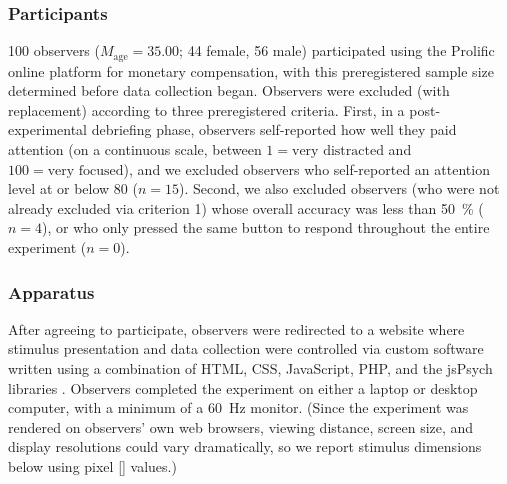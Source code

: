 \subsubsection{Participants}
100 observers ($M_\text{age} = 35.00$; 44 female, 56 male) participated using the Prolific online platform \parencite{palan_prolificacsubject_2018} for monetary compensation, with this preregistered sample size determined before data collection began.  Observers were excluded (with replacement) according to three preregistered criteria.  First, in a post-experimental debriefing phase, observers self-reported how well they paid attention (on a continuous scale, between $1 = \text{very distracted}$ and $100 = \text{very focused}$), and we excluded observers who self-reported an attention level at or below 80 ($n = 15$).  Second, we also excluded observers (who were not already excluded via criterion 1) whose overall accuracy was less than \qty{50}{\percent} ($n = 4$), or who only pressed the same button to respond throughout the entire experiment ($n = 0$).
\subsubsection{Apparatus}
After agreeing to participate, observers were redirected to a website where stimulus presentation and data collection were controlled via custom software written using a combination of HTML, CSS, JavaScript, PHP, and the jsPsych libraries \parencite{de_leeuw_jspsych_2023}.  Observers completed the experiment on either a laptop or desktop computer, with a minimum of a \qty{60}{\hertz} monitor. (Since the experiment was rendered on observers’ own web browsers, viewing distance, screen size, and display resolutions could vary dramatically, so we report stimulus dimensions below using pixel [\unit{\pixel}] values.)

